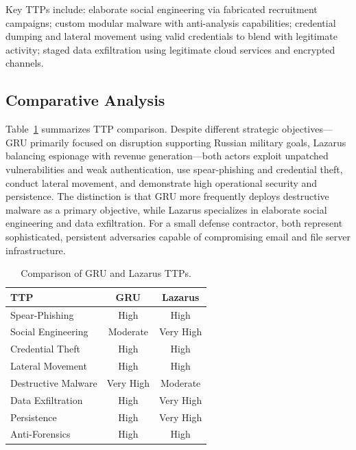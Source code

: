 \documentclass[sigconf,nonacm]{acmart}
\begin{document}
Key TTPs include: elaborate social engineering via fabricated recruitment campaigns;
custom modular malware with anti-analysis capabilities; credential dumping and lateral
movement using valid credentials to blend with legitimate activity; staged data
exfiltration using legitimate cloud services and encrypted channels.

\subsection{Comparative Analysis}

Table~\ref{tab:comparison} summarizes TTP comparison. Despite different strategic
objectives---GRU primarily focused on disruption supporting Russian military goals,
Lazarus balancing espionage with revenue generation---both actors exploit unpatched
vulnerabilities and weak authentication, use spear-phishing and credential theft,
conduct lateral movement, and demonstrate high operational security and persistence.
The distinction is that GRU more frequently deploys destructive malware as a primary
objective, while Lazarus specializes in elaborate social engineering and data
exfiltration. For a small defense contractor, both represent sophisticated, persistent
adversaries capable of compromising email and file server infrastructure.

\begin{table}[h]
\caption{Comparison of GRU and Lazarus TTPs.}
\label{tab:comparison}
\small
\begin{tabularx}{\columnwidth}{@{}Xcc@{}}
\toprule
\textbf{TTP} & \textbf{GRU} & \textbf{Lazarus} \\
\midrule
Spear-Phishing       & High      & High      \\
Social Engineering   & Moderate  & Very High \\
Credential Theft     & High      & High      \\
Lateral Movement     & High      & High      \\
Destructive Malware  & Very High & Moderate  \\
Data Exfiltration    & High      & Very High \\
Persistence          & High      & Very High \\
Anti-Forensics       & High      & High      \\
\bottomrule
\end{tabularx}
\end{table}
\end{document}
